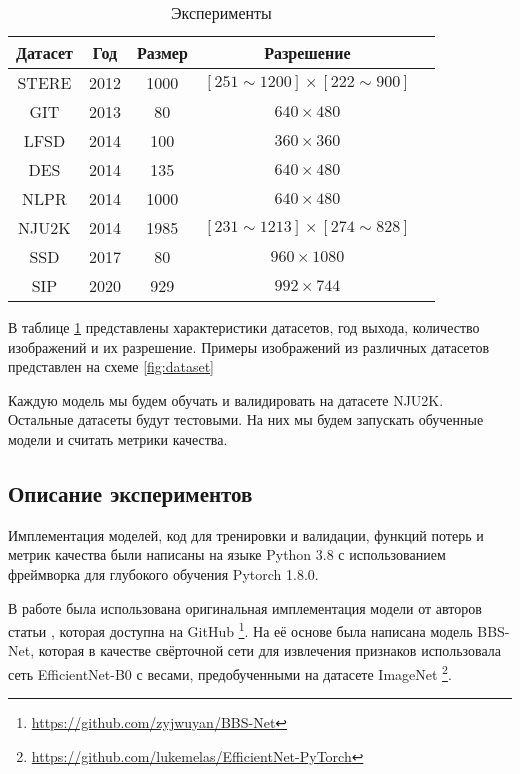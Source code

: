 \begin{center}
    \begin{table}
        \begin{tabular}{|c|c|c|c|c|}
            \hline
            Датасет & Год & Размер & Разрешение\\
            \hline
            \hline
            STERE\cite{STERE} & 2012 & 1000 & $[251 \sim 1200] \times [222 \sim 900]$ \\
            \hline
            GIT\cite{GIT} & 2013 & 80 & $640 \times 480$ \\
            \hline
            LFSD\cite{LFSD} & 2014 & 100 & $360 \times 360$ \\
            \hline
            DES\cite{DES} & 2014 & 135 & $640 \times 480$  \\
            \hline
            NLPR\cite{NLPR} & 2014 & 1000 &  $640 \times 480$ \\
            \hline
            NJU2K\cite{NJU2K} & 2014 & 1985 & $[231 \sim 1213] \times [274 \sim 828]$\\
            \hline
            SSD\cite{SSD} & 2017 & 80 & $960 \times 1080$\\
            \hline
            SIP\cite{Rethinking-RGBD} & 2020 & 929 &  $992 \times 744$\\
            \hline
        \end{tabular}
    \caption{Эксперименты}
    \label{tab:datasets}
    \end{table}
\end{center}

В таблице \ref{tab:datasets} представлены характеристики датасетов, год выхода, количество изображений и их разрешение.
Примеры изображений из различных датасетов представлен на схеме \ref{fig:dataset}


Каждую модель мы будем обучать и валидировать на датасете NJU2K. Остальные датасеты будут тестовыми. На них мы будем
запускать обученные модели и считать метрики качества.

\subsection{Описание экспериментов}

Имплементация моделей, код для тренировки и валидации, функций потерь и метрик качества были написаны на языке Python 3.8
с использованием фреймворка для глубокого обучения Pytorch 1.8.0\cite{Pytorch}.


В работе была использована оригинальная имплементация модели от авторов статьи \cite{BBS},
которая доступна на GitHub \footnote{\url{https://github.com/zyjwuyan/BBS-Net}}.
На её основе была написана модель BBS-Net, которая в качестве свёрточной сети для извлечения признаков
использовала сеть EfficientNet-B0 \cite{Efficientnet} с весами, предобученными на датасете ImageNet
\footnote{\url{https://github.com/lukemelas/EfficientNet-PyTorch}}.


